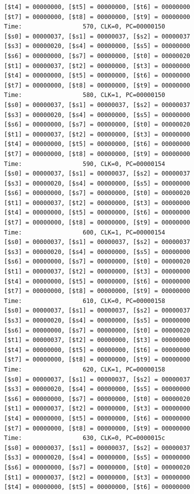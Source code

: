 \documentclass[a4paper,12pt]{article}
\begin{document}
\begin{lstlisting}
[$t4] = 00000000, [$t5] = 00000000, [$t6] = 00000000
[$t7] = 00000000, [$t8] = 00000000, [$t9] = 00000000
Time:                 570, CLK=0, PC=00000150
[$s0] = 00000037, [$s1] = 00000037, [$s2] = 00000037
[$s3] = 00000020, [$s4] = 00000000, [$s5] = 00000000
[$s6] = 00000000, [$s7] = 00000000, [$t0] = 00000020
[$t1] = 00000037, [$t2] = 00000000, [$t3] = 00000000
[$t4] = 00000000, [$t5] = 00000000, [$t6] = 00000000
[$t7] = 00000000, [$t8] = 00000000, [$t9] = 00000000
Time:                 580, CLK=1, PC=00000150
[$s0] = 00000037, [$s1] = 00000037, [$s2] = 00000037
[$s3] = 00000020, [$s4] = 00000000, [$s5] = 00000000
[$s6] = 00000000, [$s7] = 00000000, [$t0] = 00000020
[$t1] = 00000037, [$t2] = 00000000, [$t3] = 00000000
[$t4] = 00000000, [$t5] = 00000000, [$t6] = 00000000
[$t7] = 00000000, [$t8] = 00000000, [$t9] = 00000000
Time:                 590, CLK=0, PC=00000154
[$s0] = 00000037, [$s1] = 00000037, [$s2] = 00000037
[$s3] = 00000020, [$s4] = 00000000, [$s5] = 00000000
[$s6] = 00000000, [$s7] = 00000000, [$t0] = 00000020
[$t1] = 00000037, [$t2] = 00000000, [$t3] = 00000000
[$t4] = 00000000, [$t5] = 00000000, [$t6] = 00000000
[$t7] = 00000000, [$t8] = 00000000, [$t9] = 00000000
Time:                 600, CLK=1, PC=00000154
[$s0] = 00000037, [$s1] = 00000037, [$s2] = 00000037
[$s3] = 00000020, [$s4] = 00000000, [$s5] = 00000000
[$s6] = 00000000, [$s7] = 00000000, [$t0] = 00000020
[$t1] = 00000037, [$t2] = 00000000, [$t3] = 00000000
[$t4] = 00000000, [$t5] = 00000000, [$t6] = 00000000
[$t7] = 00000000, [$t8] = 00000000, [$t9] = 00000000
Time:                 610, CLK=0, PC=00000158
[$s0] = 00000037, [$s1] = 00000037, [$s2] = 00000037
[$s3] = 00000020, [$s4] = 00000000, [$s5] = 00000000
[$s6] = 00000000, [$s7] = 00000000, [$t0] = 00000020
[$t1] = 00000037, [$t2] = 00000000, [$t3] = 00000000
[$t4] = 00000000, [$t5] = 00000000, [$t6] = 00000000
[$t7] = 00000000, [$t8] = 00000000, [$t9] = 00000000
Time:                 620, CLK=1, PC=00000158
[$s0] = 00000037, [$s1] = 00000037, [$s2] = 00000037
[$s3] = 00000020, [$s4] = 00000000, [$s5] = 00000000
[$s6] = 00000000, [$s7] = 00000000, [$t0] = 00000020
[$t1] = 00000037, [$t2] = 00000000, [$t3] = 00000000
[$t4] = 00000000, [$t5] = 00000000, [$t6] = 00000000
[$t7] = 00000000, [$t8] = 00000000, [$t9] = 00000000
Time:                 630, CLK=0, PC=0000015c
[$s0] = 00000037, [$s1] = 00000037, [$s2] = 00000037
[$s3] = 00000020, [$s4] = 00000000, [$s5] = 00000000
[$s6] = 00000000, [$s7] = 00000000, [$t0] = 00000020
[$t1] = 00000037, [$t2] = 00000000, [$t3] = 00000000
[$t4] = 00000000, [$t5] = 00000000, [$t6] = 00000000

\end{lstlisting}
\end{document}
